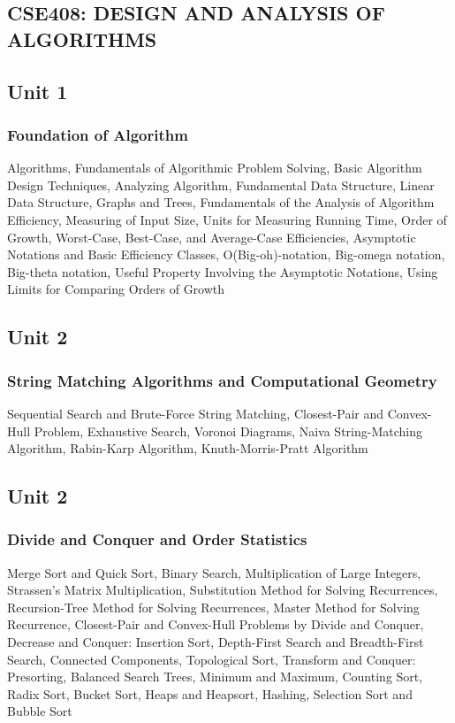 \documentclass{article}
\begin{document}
\begin{multicols*}{2}
    \section*{CSE408: DESIGN AND ANALYSIS OF ALGORITHMS}
    \subsection*{Unit 1}
    \subsubsection*{Foundation of Algorithm}
    Algorithms, Fundamentals of Algorithmic Problem Solving, Basic Algorithm Design Techniques, Analyzing Algorithm, Fundamental Data Structure, Linear Data
    Structure, Graphs and Trees, Fundamentals of the Analysis of Algorithm Efficiency, Measuring of Input Size, Units for Measuring Running Time, Order of Growth, Worst-Case, Best-Case, and Average-Case Efficiencies, Asymptotic Notations and Basic Efficiency Classes, O(Big-oh)-notation, Big-omega notation, Big-theta notation, Useful Property Involving the Asymptotic Notations, Using Limits for
    Comparing Orders of Growth
    \subsection*{Unit 2}
    \subsubsection*{String Matching Algorithms and Computational Geometry}Sequential Search and Brute-Force String Matching, Closest-Pair and Convex-Hull Problem, Exhaustive Search, Voronoi Diagrams, Naiva String-Matching Algorithm, Rabin-Karp Algorithm, Knuth-Morris-Pratt Algorithm
    \subsection*{Unit 2}
    \subsubsection*{Divide and Conquer and Order Statistics}
    Merge Sort and Quick Sort, Binary Search, Multiplication of Large Integers, Strassen's Matrix Multiplication, Substitution Method for Solving Recurrences, Recursion-Tree Method for Solving Recurrences, Master Method for Solving Recurrence, Closest-Pair and Convex-Hull Problems by Divide and Conquer, Decrease and Conquer: Insertion Sort, Depth-First Search and Breadth-First Search, Connected Components, Topological Sort, Transform and Conquer: Presorting, Balanced Search Trees, Minimum and Maximum, Counting Sort, Radix Sort, Bucket Sort, Heaps and Heapsort, Hashing, Selection Sort and Bubble Sort

\end{multicols*}
\end{document}

